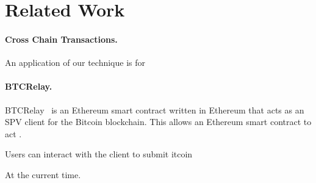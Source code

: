 \section{Related Work}

\paragraph{Cross Chain Transactions.}
An application of our technique is for 


\paragraph{BTCRelay.}
BTCRelay~\cite{btcrelay} is an Ethereum smart contract written in Ethereum that acts as an SPV client for the Bitcoin blockchain.
This allows an Ethereum smart contract to act .

Users can interact with the client to submit itcoin

At the current time.
